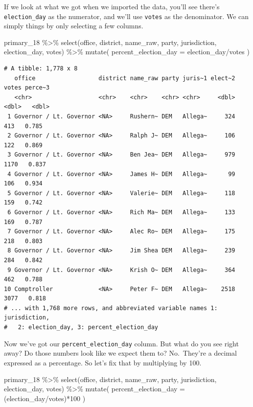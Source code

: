 \documentclass[
  letterpaper,
  DIV=11,
  numbers=noendperiod]{scrreprt}
\newenvironment{Shaded}{\begin{snugshade}}{\end{snugshade}}
\newcommand{\AttributeTok}[1]{\textcolor[rgb]{0.40,0.45,0.13}{#1}}
\newcommand{\DecValTok}[1]{\textcolor[rgb]{0.68,0.00,0.00}{#1}}
\newcommand{\FunctionTok}[1]{\textcolor[rgb]{0.28,0.35,0.67}{#1}}
\newcommand{\NormalTok}[1]{\textcolor[rgb]{0.00,0.23,0.31}{#1}}
\newcommand{\SpecialCharTok}[1]{\textcolor[rgb]{0.37,0.37,0.37}{#1}}
\begin{document}
If we look at what we got when we imported the data, you'll see there's
\texttt{election\_day} as the numerator, and we'll use \texttt{votes} as
the denominator. We can simply things by only selecting a few columns.

\begin{Shaded}
\begin{Highlighting}[]
\NormalTok{primary\_18 }\SpecialCharTok{\%\textgreater{}\%}
  \FunctionTok{select}\NormalTok{(office, district, name\_raw, party, jurisdiction, election\_day, votes) }\SpecialCharTok{\%\textgreater{}\%}
  \FunctionTok{mutate}\NormalTok{(}
  \AttributeTok{percent\_election\_day =}\NormalTok{ election\_day}\SpecialCharTok{/}\NormalTok{votes}
\NormalTok{)}
\end{Highlighting}
\end{Shaded}

\begin{verbatim}
# A tibble: 1,778 x 8
   office                  district name_raw party juris~1 elect~2 votes perce~3
   <chr>                   <chr>    <chr>    <chr> <chr>     <dbl> <dbl>   <dbl>
 1 Governor / Lt. Governor <NA>     Rushern~ DEM   Allega~     324   413   0.785
 2 Governor / Lt. Governor <NA>     Ralph J~ DEM   Allega~     106   122   0.869
 3 Governor / Lt. Governor <NA>     Ben Jea~ DEM   Allega~     979  1170   0.837
 4 Governor / Lt. Governor <NA>     James H~ DEM   Allega~      99   106   0.934
 5 Governor / Lt. Governor <NA>     Valerie~ DEM   Allega~     118   159   0.742
 6 Governor / Lt. Governor <NA>     Rich Ma~ DEM   Allega~     133   169   0.787
 7 Governor / Lt. Governor <NA>     Alec Ro~ DEM   Allega~     175   218   0.803
 8 Governor / Lt. Governor <NA>     Jim Shea DEM   Allega~     239   284   0.842
 9 Governor / Lt. Governor <NA>     Krish O~ DEM   Allega~     364   462   0.788
10 Comptroller             <NA>     Peter F~ DEM   Allega~    2518  3077   0.818
# ... with 1,768 more rows, and abbreviated variable names 1: jurisdiction,
#   2: election_day, 3: percent_election_day
\end{verbatim}

Now we've got our \texttt{percent\_election\_day} column. But what do
you see right away? Do those numbers look like we expect them to?
No.~They're a decimal expressed as a percentage. So let's fix that by
multiplying by 100.

\begin{Shaded}
\begin{Highlighting}[]
\NormalTok{primary\_18 }\SpecialCharTok{\%\textgreater{}\%}
  \FunctionTok{select}\NormalTok{(office, district, name\_raw, party, jurisdiction, election\_day, votes) }\SpecialCharTok{\%\textgreater{}\%}
  \FunctionTok{mutate}\NormalTok{(}
  \AttributeTok{percent\_election\_day =}\NormalTok{ (election\_day}\SpecialCharTok{/}\NormalTok{votes)}\SpecialCharTok{*}\DecValTok{100}
\NormalTok{)}
\end{Highlighting}
\end{Shaded}
\end{document}
